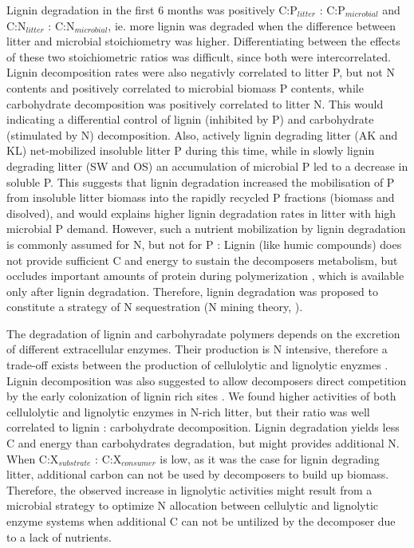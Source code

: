 

Lignin degradation in the first 6 months was positively C:P$_{litter}$ : C:P$_{microbial}$ and C:N$_{litter}$ : C:N$_{microbial}$, ie. more lignin was degraded when the difference between litter and microbial stoichiometry was higher. Differentiating between the effects of these two stoichiometric ratios was difficult, since both were intercorrelated. Lignin decomposition rates were also negativly correlated to litter P, but not N contents and positively correlated to microbial biomass P contents, while carbohydrate decomposition was positively correlated to litter N. This would indicating a differential control of lignin (inhibited by P) and carbohydrate (stimulated by N) decomposition. Also, actively lignin degrading litter (AK and KL) net-mobilized insoluble litter P during this time, while in slowly lignin degrading litter (SW and OS) an accumulation of microbial P led to a decrease in soluble P. This suggests that lignin degradation increased the mobilisation of P from insoluble litter biomass into the rapidly recycled P fractions (biomass and disolved), and would explains higher lignin degradation rates in litter with high microbial P demand. However, such a nutrient mobilization by lignin degradation is commonly assumed for N, but not for P \cite{Craine2007}: Lignin (like humic compounds) does not provide sufficient C and energy to sustain the decomposers metabolism, but occludes important amounts of protein during polymerization \cite{Achyuthan2010}, which is available only after lignin degradation. Therefore, lignin degradation was proposed to constitute a strategy of N sequestration (N mining theory, \cite{Sinsabaugh2006, Craine2007}). 

The degradation of lignin and carbohyradate polymers depends on the excretion of different extracellular enzymes. Their production is N intensive, therefore a trade-off exists between the production of cellulolytic and lignolytic enyzmes \cite{Sinsabaugh2010}. Lignin decomposition was also suggested to allow decomposers direct competition by the early colonization of lignin rich sites \cite{Treseder 2011}. We found higher activities of both cellulolytic and lignolytic enzymes in N-rich litter, but their ratio was well correlated to lignin : carbohydrate decomposition. Lignin degradation yields less C and energy than carbohydrates degradation, but might provides additional N. When C:X$_{substrate}$ : C:X$_{consumer}$ is low, as it was the case for lignin degrading litter, additional carbon can not be used by decomposers to build up biomass. Therefore, the observed increase in lignolytic activities might result from a microbial strategy to optimize N allocation between cellulytic and lignolytic enzyme 
systems when additional C can not be untilized by the decomposer due to a lack of nutrients. 

